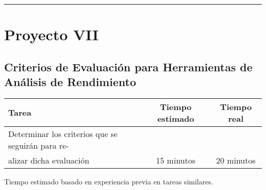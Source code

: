 \documentclass[12pt,a4paper]{article}
\newcommand{\separadorseccion}{%
    \vspace{1em}
    \hrule
    \vspace{1em}
}
\begin{document}
\separadorseccion

\section{Proyecto VII}
\subsection{Criterios de Evaluación para Herramientas de Análisis de Rendimiento}
    \begin{center}
        \begin{tabular}{|l|c|c|}
            \hline
            \textbf{Tarea} & \textbf{Tiempo estimado} & \textbf{Tiempo real} \\
            \hline
            Determinar los criterios que se seguirán para re-
\\alizar dicha evaluación & 15 minutos & 20 minutos \\
            \hline
        \end{tabular}
    \end{center}
    \begin{center}
        Tiempo estimado basado en experiencia previa en tareas similares.
    \end{center}
\end{document}
